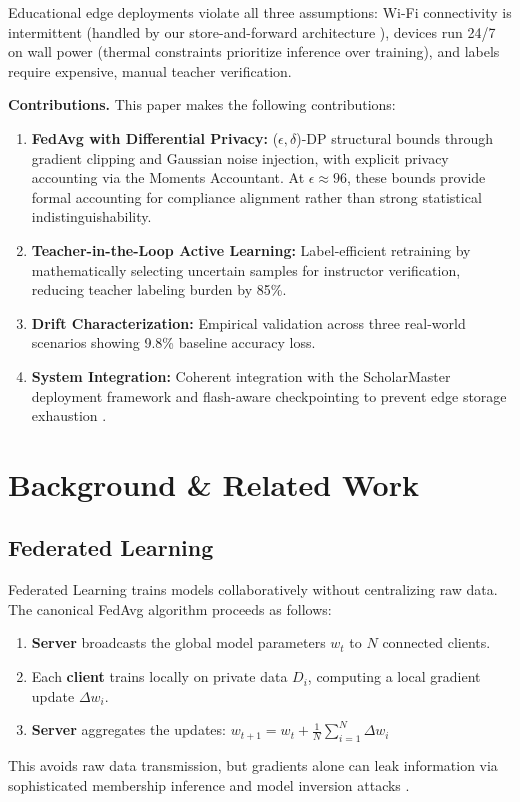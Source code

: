 \documentclass[conference]{IEEEtran}
\begin{document}
Educational edge deployments violate all three assumptions: Wi-Fi connectivity is intermittent (handled by our store-and-forward architecture \cite{b1}), devices run 24/7 on wall power (thermal constraints prioritize inference over training), and labels require expensive, manual teacher verification.

\textbf{Contributions.} This paper makes the following contributions:

\begin{enumerate}
    \item \textbf{FedAvg with Differential Privacy:} ($\epsilon, \delta$)-DP structural bounds through gradient clipping and Gaussian noise injection, with explicit privacy accounting via the Moments Accountant. At $\epsilon \approx 96$, these bounds provide formal accounting for compliance alignment rather than strong statistical indistinguishability.
    \item \textbf{Teacher-in-the-Loop Active Learning:} Label-efficient retraining by mathematically selecting uncertain samples for instructor verification, reducing teacher labeling burden by 85\%.
    \item \textbf{Drift Characterization:} Empirical validation across three real-world scenarios showing 9.8\% baseline accuracy loss.
    \item \textbf{System Integration:} Coherent integration with the ScholarMaster deployment framework \cite{b1} and flash-aware checkpointing to prevent edge storage exhaustion \cite{b9}.
\end{enumerate}

\section{Background \& Related Work}

\subsection{Federated Learning}



Federated Learning \cite{b6} trains models collaboratively without centralizing raw data. The canonical FedAvg algorithm proceeds as follows:
\begin{enumerate}
    \item \textbf{Server} broadcasts the global model parameters $w_t$ to $N$ connected clients.
    \item Each \textbf{client} trains locally on private data $D_i$, computing a local gradient update $\Delta w_i$.
    \item \textbf{Server} aggregates the updates: $w_{t+1} = w_t + \frac{1}{N}\sum_{i=1}^{N} \Delta w_i$
\end{enumerate}
This avoids raw data transmission, but gradients alone can leak information via sophisticated membership inference and model inversion attacks \cite{b10}.
\end{document}

